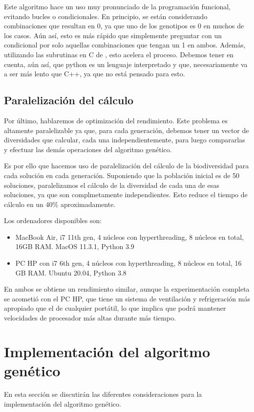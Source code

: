 Este algoritmo hace un uso muy pronunciado de la programación funcional, evitando bucles o condicionales. En principio, se están considerando combinaciones que resultan en 0, ya que uno de los genotipos es 0 en muchos de los casos. Aún así, esto es más rápido que simplemente preguntar con un condicional por solo aquellas combinaciones que tengan un 1 en ambos. Además, utilizando las subrutinas en C de , esto acelera el proceso. Debemos tener en cuenta, aún así, que python es un lenguaje interpretado y que, necesariamente va a ser más lento que C++, ya que no está pensado para esto.


\subsection{Paralelización del cálculo}
Por último, hablaremos de optimización del rendimiento. Este problema es altamente paralelizable ya que, para cada generación, debemos tener un vector de diversidades que calcular, cada una independientemente, para luego compararlas y efectuar las demás operaciones del algoritmo genético.

Es por ello que hacemos uso de paralelización del cálculo de la biodiversidad para cada solución en cada generación. Suponiendo que la población inicial es de 50 soluciones, paralelizamos el cálculo de la diversidad de cada una de esas soluciones, ya que son complmetamente independientes. Esto reduce el tiempo de cálculo en un 40\% aproximadamente. 

Los ordenadores disponibles son:

\begin{itemize}
    \item MacBook Air, i7 11th gen, 4 núcleos con hyperthreading, 8 núcleos en total, 16GB RAM. MacOS 11.3.1, Python 3.9
    \item PC HP con i7 6th gen, 4 núcleos con hyperthreading, 8 núcleos en total, 16 GB RAM. Ubuntu 20.04, Python 3.8
\end{itemize}

En ambos se obtiene un rendimiento similar, aunque la experimentación completa se acometió con el PC HP, que tiene un sistema de ventilación y refrigeración más apropiado que el de cualquier portátil, lo que implica que podrá mantener velocidades de procesador más altas durante más tiempo.


\section{Implementación del algoritmo genético}
En esta sección se discutirán las diferentes consideraciones para la implementación del algoritmo genético.



